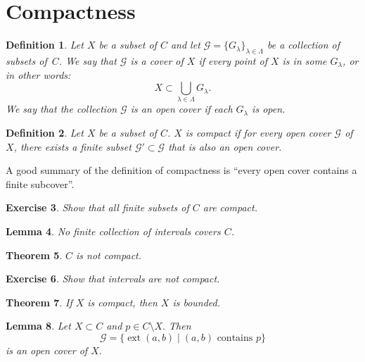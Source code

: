 \documentclass{amsart}
\newtheorem{theorem}{Theorem}
\newtheorem{lemma}[theorem]{Lemma}
\newtheorem{definition}[theorem]{Definition}
\newtheorem{exercise}[theorem]{Exercise}
\newcommand{\1}{\mathds{1}}
\DeclareMathOperator{\ext}{ext}
\numberwithin{equation}{section}
\numberwithin{theorem}{section}
\begin{document}
\section{Compactness}



\begin{definition}  Let $X$ be a subset of $C$ and let $\mathcal{G} = \{ G_{\lambda} \}_{\lambda \in \Lambda}$ be a collection of subsets of~$C$.  We say that $\mathcal{G}$ is a \emph{cover} of $X$ if every point of $X$ is in some $G_{\lambda}$, or in other words:
\[
X \subset \bigcup_{\lambda \in \Lambda} G_{\lambda}.
\]
We say that the collection $\mathcal{G}$ is an \emph{open cover} if each $G_{\lambda}$ is open.
\end{definition}

\begin{definition}  Let $X$ be a subset of $C$.  $X$ is \emph{compact} if for every open cover $\mathcal{G}$ of $X$, there exists a finite subset $\mathcal{G}' \subset \mathcal{G}$ that is also an open cover.
\end{definition}

\noindent  A good summary of the definition of compactness is ``every open cover contains a finite subcover''.


\begin{exercise}
Show that all finite subsets of $C$ are compact.
\end{exercise} 

\begin{lemma}
No finite collection of intervals covers $C$.
\end{lemma}

\begin{theorem}  
$C$ is not compact.

\end{theorem}


\begin{exercise}
Show that intervals are not compact.
\end{exercise} 

\begin{theorem}  \label{compactimpliesbounded} If $X$ is compact, then $X$ is bounded.
\end{theorem}


\begin{lemma}   Let $X\subset C$ and $p\in C\setminus X.$ Then
\[
\mathcal{G} = \{ \ext(a,b) \mid (a,b) \text{ contains } p  \}
\]
is an open cover of $X.$ 
\end{lemma}
\end{document}
